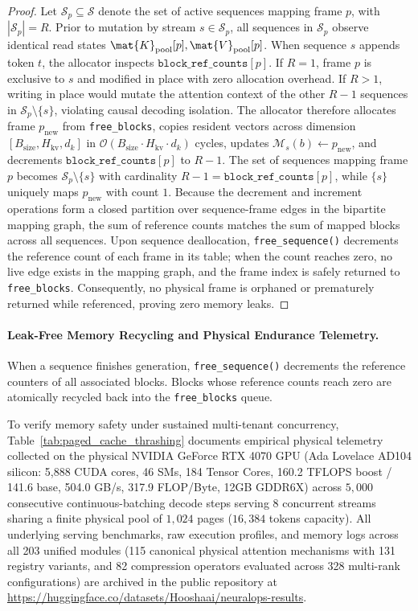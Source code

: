\begin{proof}
Let $\mathcal{S}_p \subseteq \mathcal{S}$ denote the set of active sequences mapping frame $p$, with $|\mathcal{S}_p| = R$. 
Prior to mutation by stream $s \in \mathcal{S}_p$, all sequences in $\mathcal{S}_p$ observe identical read states $\mat{K}_{\text{pool}}[p], \mat{V}_{\text{pool}}[p]$.
When sequence $s$ appends token $t$, the allocator inspects $\texttt{block\_ref\_counts}[p]$. If $R = 1$, frame $p$ is exclusive to $s$ and modified in place with zero allocation overhead.
If $R > 1$, writing in place would mutate the attention context of the other $R-1$ sequences in $\mathcal{S}_p \setminus \{s\}$, violating causal decoding isolation. 
The allocator therefore allocates frame $p_{\text{new}}$ from \texttt{free\_blocks}, copies resident vectors across dimension $[B_{\text{size}}, H_{\text{kv}}, d_k]$ in $\mathcal{O}(B_{\text{size}} \cdot H_{\text{kv}} \cdot d_k)$ cycles, updates $\mathcal{M}_s(b) \leftarrow p_{\text{new}}$, and decrements $\texttt{block\_ref\_counts}[p]$ to $R-1$. 
The set of sequences mapping frame $p$ becomes $\mathcal{S}_p \setminus \{s\}$ with cardinality $R-1 = \texttt{block\_ref\_counts}[p]$, while $\{s\}$ uniquely maps $p_{\text{new}}$ with count $1$. 
Because the decrement and increment operations form a closed partition over sequence-frame edges in the bipartite mapping graph, the sum of reference counts matches the sum of mapped blocks across all sequences. 
Upon sequence deallocation, \texttt{free\_sequence()} decrements the reference count of each frame in its table; when the count reaches zero, no live edge exists in the mapping graph, and the frame index is safely returned to \texttt{free\_blocks}. Consequently, no physical frame is orphaned or prematurely returned while referenced, proving zero memory leaks.
\end{proof}

\paragraph{Leak-Free Memory Recycling and Physical Endurance Telemetry.}
When a sequence finishes generation, \texttt{free\_sequence()} decrements the reference counters of all associated blocks. Blocks whose reference counts reach zero are atomically recycled back into the \texttt{free\_blocks} queue.

To verify memory safety under sustained multi-tenant concurrency, Table~\ref{tab:paged_cache_thrashing} documents empirical physical telemetry collected on the physical NVIDIA GeForce RTX 4070 GPU (Ada Lovelace AD104 silicon: 5,888 CUDA cores, 46 SMs, 184 Tensor Cores, 160.2 TFLOPS boost / 141.6 base, 504.0 GB/s, 317.9 FLOP/Byte, 12GB GDDR6X) across $5{,}000$ consecutive continuous-batching decode steps serving 8 concurrent streams sharing a finite physical pool of $1{,}024$ pages ($16{,}384$ tokens capacity). All underlying serving benchmarks, raw execution profiles, and memory logs across all 203 unified modules (115 canonical physical attention mechanisms with 131 registry variants, and 82 compression operators evaluated across 328 multi-rank configurations) are archived in the public repository at \url{https://huggingface.co/datasets/Hooshaai/neuralops-results}.

